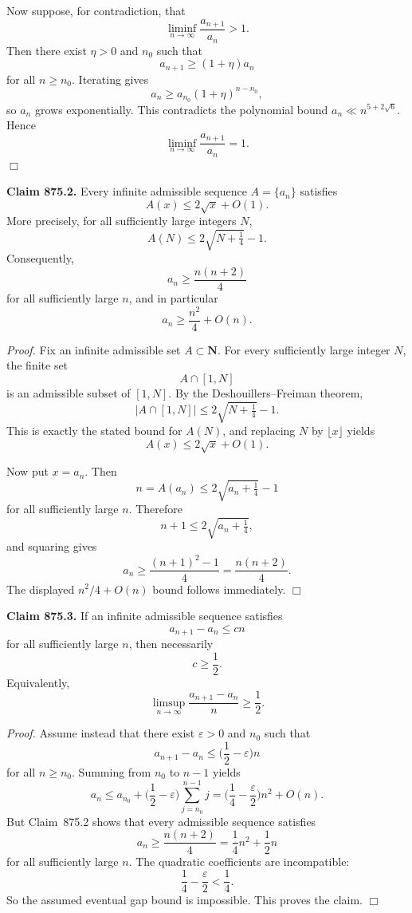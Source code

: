 Now suppose, for contradiction, that
\[
\liminf_{n\to\infty}\frac{a_{n+1}}{a_n}>1.
\]
Then there exist \(\eta>0\) and \(n_0\) such that
\[
a_{n+1}\ge (1+\eta)a_n
\]
for all \(n\ge n_0\). Iterating gives
\[
a_n\ge a_{n_0}(1+\eta)^{n-n_0},
\]
so \(a_n\) grows exponentially. This contradicts the polynomial bound \(a_n\ll n^{5+2\sqrt6}\). Hence
\[
\liminf_{n\to\infty}\frac{a_{n+1}}{a_n}=1.
\]
\hfill\(\Box\)

\medskip
\noindent\textbf{Claim 875.2.}
Every infinite admissible sequence \(A=\{a_n\}\) satisfies
\[
A(x)\le 2\sqrt x+O(1).
\]
More precisely, for all sufficiently large integers \(N\),
\[
A(N)\le 2\sqrt{N+\tfrac14}-1.
\]
Consequently,
\[
a_n\ge \frac{n(n+2)}{4}
\]
for all sufficiently large \(n\), and in particular
\[
a_n\ge \frac{n^2}{4}+O(n).
\]

\medskip
\noindent\emph{Proof.}
Fix an infinite admissible set \(A\subset \mathbf{N}\). For every sufficiently large integer \(N\), the finite set
\[
A\cap [1,N]
\]
is an admissible subset of \([1,N]\). By the Deshouillers--Freiman theorem,
\[
|A\cap [1,N]|\le 2\sqrt{N+\tfrac14}-1.
\]
This is exactly the stated bound for \(A(N)\), and replacing \(N\) by \(\lfloor x\rfloor\) yields
\[
A(x)\le 2\sqrt x+O(1).
\]

Now put \(x=a_n\). Then
\[
n=A(a_n)\le 2\sqrt{a_n+\tfrac14}-1
\]
for all sufficiently large \(n\). Therefore
\[
n+1\le 2\sqrt{a_n+\tfrac14},
\]
and squaring gives
\[
a_n\ge \frac{(n+1)^2-1}{4}=\frac{n(n+2)}{4}.
\]
The displayed \(n^2/4+O(n)\) bound follows immediately.
\hfill\(\Box\)

\medskip
\noindent\textbf{Claim 875.3.}
If an infinite admissible sequence satisfies
\[
a_{n+1}-a_n\le c n
\]
for all sufficiently large \(n\), then necessarily
\[
c\ge \frac12.
\]
Equivalently,
\[
\limsup_{n\to\infty}\frac{a_{n+1}-a_n}{n}\ge \frac12.
\]

\medskip
\noindent\emph{Proof.}
Assume instead that there exist \(\varepsilon>0\) and \(n_0\) such that
\[
a_{n+1}-a_n\le \Big(\frac12-\varepsilon\Big)n
\]
for all \(n\ge n_0\). Summing from \(n_0\) to \(n-1\) yields
\[
a_n\le a_{n_0}+\Big(\frac12-\varepsilon\Big)\sum_{j=n_0}^{n-1}j
= \Big(\frac14-\frac{\varepsilon}{2}\Big)n^2+O(n).
\]
But Claim~875.2 shows that every admissible sequence satisfies
\[
a_n\ge \frac{n(n+2)}{4}=\frac14 n^2+\frac12 n
\]
for all sufficiently large \(n\). The quadratic coefficients are incompatible:
\[
\frac14-\frac{\varepsilon}{2}<\frac14.
\]
So the assumed eventual gap bound is impossible. This proves the claim.
\hfill\(\Box\)

